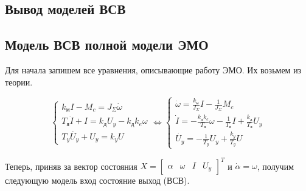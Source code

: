 \documentclass[a4paper, 12pt]{article}
\begin{document}
\newpage
\begin{center}
\section{Вывод моделей ВСВ}
\end{center}
\subsection{Модель ВСВ полной модели ЭМО}
Для начала запишем все уравнения, описывающие работу ЭМО. Их возьмем из теории.

\begin{equation}
    \begin{cases}
        k_\text{м}I - M_c = J_\Sigma \dot{\omega} \\
        T_\text{я}\dot{I} + I = k_\text{д}U_y - k_\text{д}k_e\omega \\
        T_y\dot{U_y} + U_y = k_yU
    \end{cases} \Leftrightarrow
    \begin{cases}
        \dot{\omega} = \frac{k_\text{м}}{J_\Sigma}I - \frac{1}{J_\Sigma}M_c \\
        \dot{I} = - \frac{k_\text{д}k_e}{T_\text{я}}\omega - \frac{1}{T_\text{я}}I + \frac{k_\text{д}}{T_\text{я}}U_y \\
        \dot{U_y} = -\frac{1}{T_y}U_y + \frac{k_y}{T_y}U
    \end{cases}
\end{equation} \par
Теперь, приняв за вектор состояния $X = \begin{bmatrix} \alpha & \omega & I & U_y \end{bmatrix}^T$ и $\dot{\alpha} = \omega$, получим следующую модель вход состояние выход (ВСВ).
\end{document}
